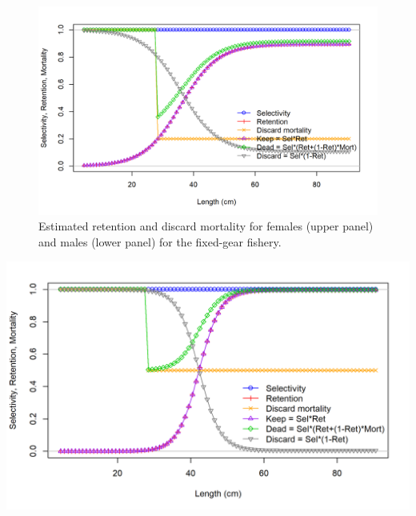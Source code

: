 \documentclass[11pt,
  english,
  a4paper,
]{article}
\begin{document}
\tagmcend\tagstructend


\begin{figure}
\centering
\includegraphics[width=1\textwidth,height=1\textheight]{figs/sel09_len_flt1sex2.png}
\caption{Estimated retention and discard mortality for females (upper panel) and males (lower panel) for the fixed-gear fishery.\label{fig:selectivityatageFIX}}
\end{figure}

\tagmcend\tagstructend

\clearpage


\includegraphics[width=1\textwidth,height=1\textheight]{figs/sel09_len_flt3sex1.png}

\tagmcend\tagstructend

\end{document}
